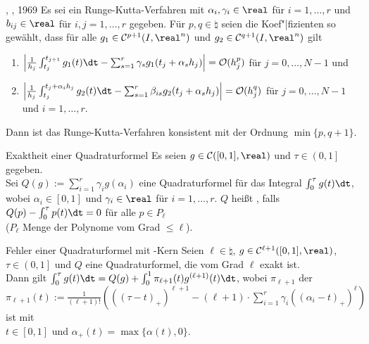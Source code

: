 \begin{Satz}{, , 1969}
    Es sei ein Runge-Kutta-Verfahren mit $\alpha_i, \gamma_i \in \real$ für
    $i = 1, \dotsc, r$ und $b_{ij} \in \real$ für $i, j = 1, \dotsc, r$
    gegeben.
    Für $p, q \in \natural$ seien die Koef"|fizienten so gewählt, dass
    für alle $g_1 \in \C^{p+1}(I, \real^n)$ und $g_2 \in \C^{q+1}(I, \real^n)$
    gilt
    \begin{enumerate}[label=(\emph{\roman*})]
        \item
        $\left|\frac{1}{h_j} \int_{t_j}^{t_{j+1}} g_1(t)\dt -
        \sum_{s=1}^r \gamma_s g_1(t_j + \alpha_s h_j)\right| = \O(h_j^p)$
        für $j = 0, \dotsc, N - 1$ und
        
        \item
        $\left|\frac{1}{h_j} \int_{t_j}^{t_j + \alpha_i h_j} g_2(t)\dt -
        \sum_{s=1}^r \beta_{is} g_2(t_j + \alpha_s h_j)\right| = \O(h_j^q)$
        für $j = 0, \dotsc, N - 1$ und $i = 1, \dotsc, r$.
    \end{enumerate}
    Dann ist das Runge-Kutta-Verfahren konsistent mit der Ordnung
    $\min\{p, q + 1\}$.
\end{Satz}

\linie

\begin{Def}{Exaktheit einer Quadraturformel}
    Es seien $g \in \C([0, 1], \real)$ und $\tau \in \left(0, 1\right]$
    gegeben.\\
    Sei $Q(g) := \sum_{i=1}^r \gamma_i g(\alpha_i)$ eine Quadraturformel
    für das Integral $\int_0^\tau g(t)\dt$, wobei
    $\alpha_i \in [0, 1]$ und $\gamma_i \in \real$ für $i = 1, \dotsc, r$.
    $Q$ heißt , falls
    $Q(p) - \int_0^\tau p(t)\dt = 0$ für alle $p \in P_\ell$\\
    ($P_\ell$ Menge der Polynome vom Grad $\le \ell$).
\end{Def}

\begin{Satz}{Fehler einer Quadraturformel mit -Kern}
    Seien $\ell \in \natural$, $g \in \C^{\ell+1}([0, 1], \real)$,\\
    $\tau \in \left(0, 1\right]$ und
    $Q$ eine Quadraturformel, die vom Grad $\ell$ exakt ist.\\
    Dann gilt $\int_0^\tau g(t)\dt =
    Q(g) + \int_0^1 \pi_{\ell+1}(t) g^{(\ell+1)}(t)\dt$,
    wobei $\pi_{\ell+1}$ der \\
    $\pi_{\ell+1}(t) := \frac{1}{(\ell + 1)!} (((\tau - t)_+)^{\ell+1} -
    (\ell + 1) \cdot \sum_{i=1}^r \gamma_i ((\alpha_i - t)_+)^\ell)$
    ist mit\\
    $t \in [0, 1]$ und $\alpha_+(t) = \max\{\alpha(t), 0\}$.
\end{Satz}

